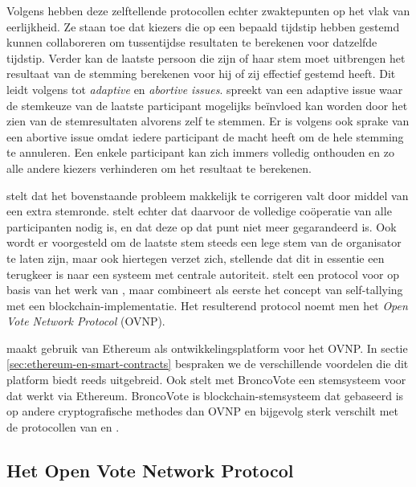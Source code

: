 		Volgens \textcite{McCorry2017}  hebben deze zelftellende protocollen echter zwaktepunten op het vlak van eerlijkheid. Ze staan toe dat kiezers die op een bepaald tijdstip hebben gestemd kunnen collaboreren om tussentijdse resultaten te berekenen voor datzelfde tijdstip. Verder kan de laatste persoon die zijn of haar stem moet uitbrengen het resultaat van de stemming berekenen voor hij of zij effectief gestemd heeft. Dit leidt volgens \textcite{McCorry2017} tot \textit{adaptive} en \textit{abortive issues}.  \textcite{McCorry2017} spreekt van een adaptive issue waar de stemkeuze van de laatste participant mogelijks beïnvloed kan worden door het zien van de stemresultaten alvorens zelf te stemmen. Er is volgens \textcite{McCorry2017}  ook sprake van een abortive issue omdat iedere participant de macht heeft om de hele stemming te annuleren. Een enkele participant kan zich immers volledig onthouden en zo alle andere kiezers verhinderen om het resultaat te berekenen. 
			
		\textcite{Kiayias2002} stelt dat het bovenstaande probleem makkelijk te corrigeren valt door middel van een extra stemronde. \textcite{McCorry2017} stelt echter dat daarvoor de volledige coöperatie van alle participanten nodig is, en dat deze op dat punt niet meer gegarandeerd is. Ook wordt er voorgesteld om de laatste stem steeds een lege stem van de organisator te laten zijn, maar ook hiertegen verzet \textcite{McCorry2017} zich, stellende dat dit in essentie een terugkeer is naar een systeem met centrale autoriteit.  \textcite{McCorry2017} stelt een protocol voor op basis van het werk van \textcite{Kiayias2002}, maar combineert als eerste het concept van self-tallying met een blockchain-implementatie. Het resulterend protocol noemt men het \textit{Open Vote Network Protocol} (OVNP).
		
		 \textcite{McCorry2017} maakt gebruik van Ethereum als ontwikkelingsplatform voor het OVNP. In sectie \ref{sec:ethereum-en-smart-contracts} bespraken we de verschillende voordelen die dit platform biedt reeds uitgebreid. Ook  stelt met BroncoVote een stemsysteem voor dat werkt via Ethereum. BroncoVote is blockchain-stemsysteem dat gebaseerd is op andere cryptografische methodes dan OVNP en bijgevolg sterk verschilt met de protocollen van \textcite{Kiayias2002} en \textcite{McCorry2017}. 
	
	\subsection{Het Open Vote Network Protocol}
	\label{sec:OVNP}
